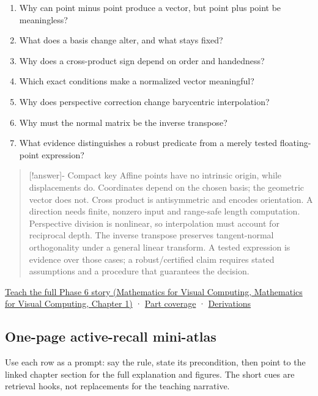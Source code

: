 \begin{enumerate}
\def\labelenumi{\arabic{enumi}.}
\tightlist
\item
  Why can point minus point produce a vector, but point plus point be meaningless?
\item
  What does a basis change alter, and what stays fixed?
\item
  Why does a cross-product sign depend on order and handedness?
\item
  Which exact conditions make a normalized vector meaningful?
\item
  Why does perspective correction change barycentric interpolation?
\item
  Why must the normal matrix be the inverse transpose?
\item
  What evidence distinguishes a robust predicate from a merely tested floating-point expression?
\end{enumerate}

\begin{quote}
{[}!answer{]}- Compact key Affine points have no intrinsic origin, while displacements do. Coordinates depend on the chosen basis; the geometric vector does not. Cross product is antisymmetric and encodes orientation. A direction needs finite, nonzero input and range-safe length computation. Perspective division is nonlinear, so interpolation must account for reciprocal depth. The inverse transpose preserves tangent-normal orthogonality under a general linear transform. A tested expression is evidence over those cases; a robust/certified claim requires stated assumptions and a procedure that guarantees the decision.
\end{quote}

\href{../02-Mathematics-for-Visual-Computing/main.pdf\#nameddest=01-foundations-i-ch017-the-panel-gives-us-a-reason-to-learn}{Teach the full Phase 6 story (Mathematics for Visual Computing, Mathematics for Visual Computing, Chapter 1)} · \hyperref[appendix-fd090d982a15-phase-6---parts-501-600]{Part coverage} · \hyperref[02-foundations-ii-ch039-phase-6---geometry-reconstruction-proofs]{Derivations}

\subsection{One-page active-recall mini-atlas}\label{appendix-38d9c8aca357-one-page-active-recall-mini-atlas}

Use each row as a prompt: say the rule, state its precondition, then point to the linked chapter section for the full explanation and figures. The short cues are retrieval hooks, not replacements for the teaching narrative.

